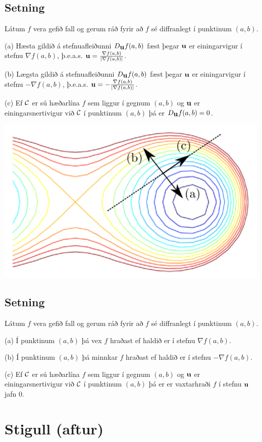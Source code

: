\documentclass[a4paper,10pt,icelandic]{sphinxmanual}
\begin{document}
\subsection{Setning}
\label{Kafli2:id49}
Látum \(f\) vera gefið fall og gerum ráð fyrir að \(f\) sé
diffranlegt í punktinum \((a,b)\).

(a) Hæsta gildið á stefnuafleiðunni \(D_{\mbox{${\bf u}$}}f(a,b)\)
fæst þegar \(\mbox{${\bf u}$}\) er einingarvigur í stefnu
\(\nabla f(a,b)\), þ.e.a.s.
\(\mbox{${\bf u}$}=\frac{\nabla f(a,b)}{|\nabla f(a,b)|}\).

(b) Lægsta gildið á stefnuafleiðunni \(D_{\mbox{${\bf u}$}}f(a,b)\)
fæst þegar \(\mbox{${\bf u}$}\) er einingarvigur í stefnu
\(-\nabla f(a,b)\), þ.e.a.s.
\(\mbox{${\bf u}$}=-\frac{\nabla f(a,b)}{|\nabla f(a,b)|}\).

(c) Ef \(\cal C\) er sú hæðarlína \(f\) sem liggur í gegnum
\((a,b)\) og \(\mbox{${\bf u}$}\) er einingarsnertivigur við
\(\cal C\) í punktinum \((a,b)\) þá er
\(D_{\mbox{${\bf u}$}}f(a,b)=0\).

{\hfill\includegraphics[width=0.500\linewidth]{contours.png}\hfill}


\subsection{Setning}
\label{Kafli2:id50}
Látum \(f\) vera gefið fall og gerum ráð fyrir að \(f\) sé
diffranlegt í punktinum \((a,b)\).

(a) Í punktinum \((a,b)\) þá vex \(f\) hraðast ef haldið er í
stefnu \(\nabla f(a,b)\).

(b) Í punktinum \((a,b)\) þá minnkar \(f\) hraðast ef haldið er
í stefnu \(-\nabla f(a,b)\).

(c) Ef \(\cal C\) er sú hæðarlína \(f\) sem liggur í gegnum
\((a,b)\) og \(\mbox{${\bf u}$}\) er einingarsnertivigur við
\(\cal C\) í punktinum \((a,b)\) þá er er vaxtarhraði \(f\)
í stefnu \(\mbox{${\bf u}$}\) jafn 0.


\section{Stigull (aftur)}
\label{Kafli2:stigull-aftur}
\end{document}
